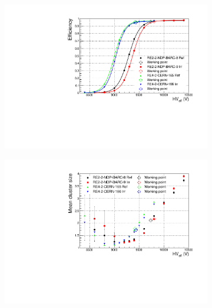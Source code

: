	\begin{figure}[H]
    	\begin{subfigure}{0.5\linewidth}
			\centering
    		\includegraphics[width = \linewidth]{fig/chapt5/Consolidation-Efficiency.pdf}
        	\caption{\label{fig:consolidation:A}}
    	\end{subfigure}
    	\begin{subfigure}{0.5\linewidth}
			\centering
    		\includegraphics[width = \linewidth]{fig/chapt5/Consolidation-Cluster-Size.pdf}
        	\caption{\label{fig:consolidation:B}}
    	\end{subfigure}
    	\begin{subfigure}{0.5\linewidth}
			\centering

\end{subfigure}
\end{figure}
